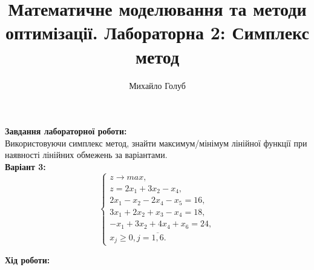 \documentclass{article}
\title{Математичне моделювання та методи оптимізації. Лабораторна 2: Симплекс метод}
\author{Михайло Голуб}
\begin{document}
\maketitle
\newpage

\textbf{Завдання лабораторної роботи:}\\

Використовуючи симплекс метод, знайти максимум/мінімум лінійної функції
при наявності лінійних обмежень за варіантами.\\

\textbf{Варіант 3:}
\begin{equation}
\left\{
\begin{array}{ll}
z \rightarrow max,\\
z = 2x_1 + 3x_2 - x_4,\\
2x_1 - x_2 - 2x_4 - x_5 = 16,\\
3x_1 + 2x_2 + x_3 - x_4 = 18,\\
-x_1+3x_2+4x_4+x_6 = 24,\\
x_j \geq 0, j = \overline{1,6}.
\end{array}
\right.
\end{equation}

\textbf{Хід роботи:}\\
\end{document}
